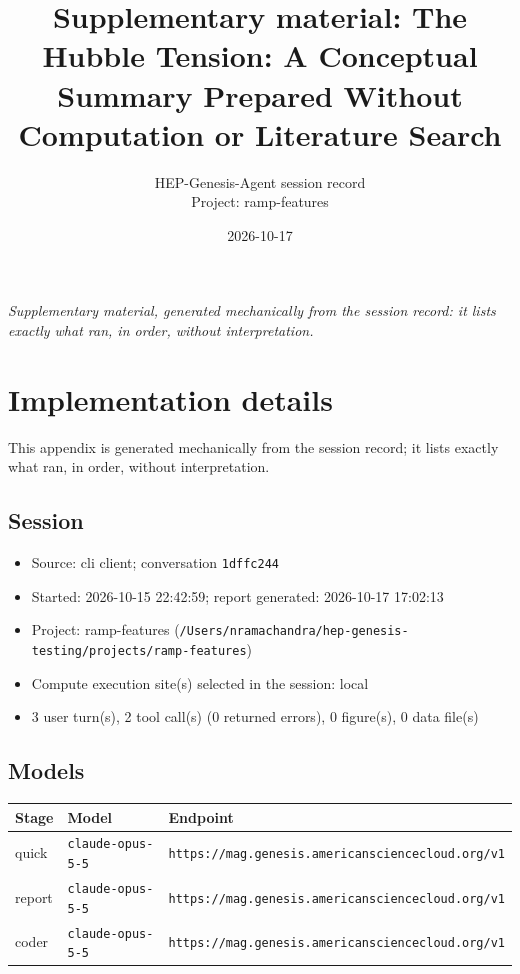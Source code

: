 \documentclass[11pt,a4paper]{article}
\title{Supplementary material: The Hubble Tension: A Conceptual Summary Prepared Without Computation or Literature Search}
\author{HEP-Genesis-Agent session record \\ \small Project: ramp-features}
\date{2026-10-17}
\begin{document}
\maketitle
\noindent\textit{\small Supplementary material, generated mechanically from the session record: it lists exactly what ran, in order, without interpretation.}
\vspace{1em}



\appendix
\section{Implementation details}
\label{app:impl}
This appendix is generated mechanically from the session record; it lists exactly what ran, in order, without interpretation.
\subsection{Session}
\begin{itemize}
  \item Source: cli client; conversation \texttt{1dffc244}
  \item Started: 2026-10-15 22:42:59; report generated: 2026-10-17 17:02:13
  \item Project: ramp-features (\texttt{/\allowbreak{}Users/\allowbreak{}nramachandra/\allowbreak{}hep-genesis-testing/\allowbreak{}projects/\allowbreak{}ramp-features})
  \item Compute execution site(s) selected in the session: local
  \item 3 user turn(s), 2 tool call(s) (0 returned errors), 0 figure(s), 0 data file(s)
\end{itemize}
\subsection{Models}
\begin{longtable}{@{}p{}p{}p{}@{}}
\toprule Stage & Model & Endpoint \\ \midrule \endhead
quick & \texttt{claude-opus-5-5} & \texttt{https:\allowbreak{}/\allowbreak{}/\allowbreak{}mag.genesis.americansciencecloud.org/\allowbreak{}v1} \\
report & \texttt{claude-opus-5-5} & \texttt{https:\allowbreak{}/\allowbreak{}/\allowbreak{}mag.genesis.americansciencecloud.org/\allowbreak{}v1} \\
coder & \texttt{claude-opus-5-5} & \texttt{https:\allowbreak{}/\allowbreak{}/\allowbreak{}mag.genesis.americansciencecloud.org/\allowbreak{}v1} \\
\bottomrule\end{longtable}
\end{document}
